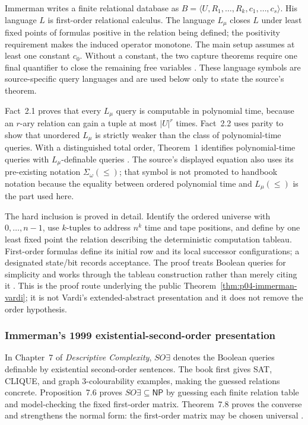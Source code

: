 Immerman writes a finite relational database as
\(B=\langle U,R_1,\ldots,R_k,c_1,\ldots,c_s\rangle\).  His language \(L\) is
first-order relational calculus.  The language \(L_\mu\) closes \(L\) under
least fixed points of formulas positive in the relation being defined; the
positivity requirement makes the induced operator monotone.  The main setup
assumes at least one constant \(c_0\).  Without a constant, the two capture
theorems require one final quantifier to close the remaining free variables
\cite[pp.~87--89]{Immerman1986}.  These language symbols are source-specific
query languages and are used below only to state the source's theorem.

Fact~2.1 proves that every \(L_\mu\) query is computable in polynomial time,
because an \(r\)-ary relation can gain a tuple at most \(\lvert U\rvert^r\)
times.  Fact~2.2 uses parity to show that unordered \(L_\mu\) is strictly weaker
than the class of polynomial-time queries.  With a distinguished total order,
Theorem~1 identifies polynomial-time queries with \(L_\mu\)-definable queries
\cite[pp.~89--93]{Immerman1986}.  The source's displayed equation also uses its
pre-existing notation \(\Sigma_\omega(\leq)\); that symbol is not promoted to
handbook notation because the equality between ordered polynomial time and
\(L_\mu(\leq)\) is the part used here.

The hard inclusion is proved in detail.  Identify the ordered universe with
\(0,\ldots,n-1\), use \(k\)-tuples to address \(n^k\) time and tape positions,
and define by one least fixed point the relation describing the deterministic
computation tableau.  First-order formulas define its initial row and its local
successor configurations; a designated state/bit records acceptance.  The
proof treats Boolean queries for simplicity and works through the tableau
construction rather than merely citing it \cite[pp.~90--93]{Immerman1986}.
This is the proof route underlying the public
Theorem~\ref{thm:p04-immerman-vardi}; it is not Vardi's extended-abstract
presentation and it does not remove the order hypothesis.

\subsubsection{Immerman's 1999 existential-second-order presentation}

In Chapter~7 of \emph{Descriptive Complexity}, \(SO\exists\) denotes the
Boolean queries definable by existential second-order sentences.  The book
first gives SAT, CLIQUE, and graph 3-colourability examples, making the guessed
relations concrete.  Proposition~7.6 proves \(SO\exists\subseteq\mathsf{NP}\)
by guessing each finite relation table and model-checking the fixed first-order
matrix.  Theorem~7.8 proves the converse and strengthens the normal form: the
first-order matrix may be chosen universal
\cite[pp.~143--148]{Immerman1999}.


